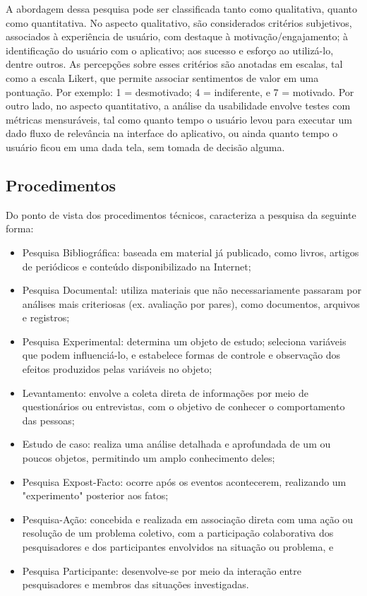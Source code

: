 A abordagem dessa pesquisa pode ser classificada tanto como qualitativa, quanto como quantitativa. No aspecto qualitativo, são considerados critérios subjetivos, associados à experiência de usuário, com destaque à motivação/engajamento; à identificação 
do usuário com o aplicativo; aos sucesso e esforço ao utilizá-lo, dentre outros. As percepções sobre esses critérios são anotadas em escalas, tal como a escala Likert, que permite associar sentimentos de valor em uma pontuação. Por exemplo: 1 = desmotivado; 
4 = indiferente, e 7 = motivado. Por outro lado, no aspecto quantitativo, a análise da usabilidade envolve testes com métricas mensuráveis, tal como quanto tempo o usuário levou para executar um dado fluxo de relevância na interface do aplicativo, ou ainda 
quanto tempo o usuário ficou em uma dada tela, sem tomada de decisão alguma.

\subsection{Procedimentos}
\label{sec:Procedimentos}
Do ponto de vista dos procedimentos técnicos,  caracteriza a pesquisa da seguinte forma:

\begin{itemize}
	\item Pesquisa Bibliográfica: baseada em material já publicado, como livros, artigos de periódicos e conteúdo disponibilizado na Internet;
	\item Pesquisa Documental: utiliza materiais que não necessariamente passaram por análises mais criteriosas (ex. avaliação por pares), como documentos, arquivos e registros;
	\item Pesquisa Experimental: determina um objeto de estudo; seleciona variáveis que podem influenciá-lo, e estabelece formas de controle e observação dos efeitos produzidos pelas variáveis no objeto;
	\item Levantamento: envolve a coleta direta de informações por meio de questionários ou entrevistas, com o objetivo de conhecer o comportamento das pessoas;
	\item Estudo de caso: realiza uma análise detalhada e aprofundada de um ou poucos objetos, permitindo um amplo conhecimento deles;
	\item Pesquisa Expost-Facto: ocorre após os eventos acontecerem, realizando um "experimento" \newline	
	posterior aos fatos;
	\item Pesquisa-Ação: concebida e realizada em associação direta com uma ação ou resolução de um problema coletivo, com a participação colaborativa dos pesquisadores e dos participantes envolvidos na situação ou problema, e
	\item Pesquisa Participante: desenvolve-se por meio da interação entre pesquisadores e membros das situações investigadas.
\end{itemize}


